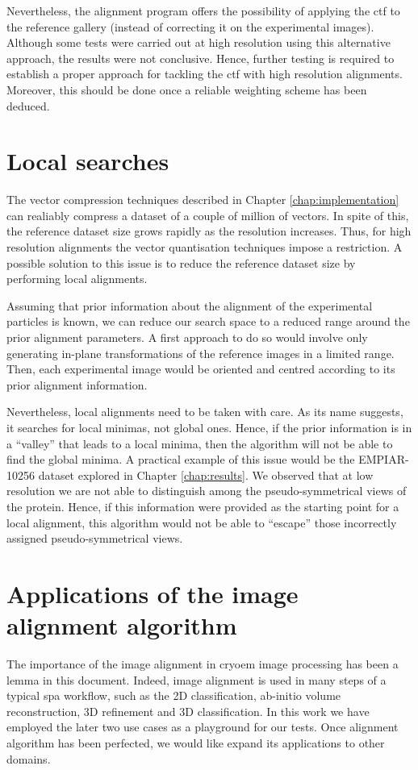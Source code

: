 \documentclass[../main.tex]{subfiles}
\begin{document}
Nevertheless, the alignment program offers the possibility of applying the \gls{ctf} to the reference gallery (instead of correcting it on the experimental images). Although some tests were carried out at high resolution using this alternative approach, the results were not conclusive. Hence, further testing is required to establish a proper approach for tackling the \gls{ctf} with high resolution alignments. Moreover, this should be done once a reliable weighting scheme has been deduced.

\section{Local searches}
The vector compression techniques described in Chapter \ref{chap:implementation} can realiably compress a dataset of a couple of million of vectors. In spite of this, the reference dataset size grows rapidly as the resolution increases. Thus, for high resolution alignments the vector quantisation techniques impose a restriction. A possible solution to this issue is to reduce the reference dataset size by performing local alignments.

Assuming that prior information about the alignment of the experimental particles is known, we can reduce our search space to a reduced range around the prior alignment parameters. A first approach to do so would involve only generating in-plane transformations of the reference images in a limited range. Then, each experimental image would be oriented and centred according to its prior alignment information. 

Nevertheless, local alignments need to be taken with care. As its name suggests, it searches for local minimas, not global ones. Hence, if the prior information is in a ``valley'' that leads to a local minima, then the algorithm will not be able to find the global minima. A practical example of this issue would be the EMPIAR-10256 dataset explored in Chapter \ref{chap:results}. We observed that at low resolution we are not able to distinguish among the pseudo-symmetrical views of the protein. Hence, if this information were provided as the starting point for a local alignment, this algorithm would not be able to ``escape'' those incorrectly assigned pseudo-symmetrical views.

\section{Applications of the image alignment algorithm}
The importance of the image alignment in \gls{cryoem} image processing has been a lemma in this document. Indeed, image alignment is used in many steps of a typical \gls{spa} workflow, such as the 2D classification, ab-initio volume reconstruction, 3D refinement and 3D classification. In this work we have employed the later two use cases as a playground for our tests. Once alignment algorithm has been perfected, we would like expand its applications to other domains. 
\end{document}
